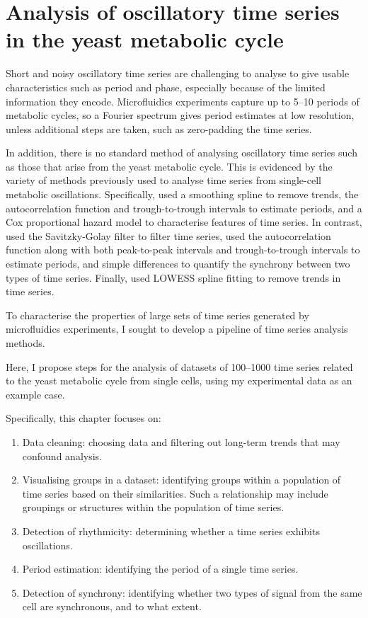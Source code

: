 \chapter{Analysis of oscillatory time series in the yeast metabolic cycle}
\label{ch:analysis}

Short and noisy oscillatory time series are challenging to analyse to give usable characteristics such as period and phase, especially because of the limited information they encode.
Microfluidics experiments capture up to 5--10 periods of metabolic cycles, so a Fourier spectrum gives period estimates at low resolution, unless additional steps are taken, such as zero-padding the time series.

In addition, there is no standard method of analysing oscillatory time series such as those that arise from the yeast metabolic cycle.
This is evidenced by the variety of methods previously used to analyse time series from single-cell metabolic oscillations.
Specifically, \textcite{papagiannakisAutonomousMetabolicOscillations2017} used a smoothing spline to remove trends, the autocorrelation function and trough-to-trough intervals to estimate periods, and a Cox proportional hazard model \parencite{coxRegressionModelsLifeTables1972} to characterise features of time series.
In contrast, \textcite{baumgartnerFlavinbasedMetabolicCycles2018} used the Savitzky-Golay filter to filter time series, used the autocorrelation function along with both peak-to-peak intervals and trough-to-trough intervals to estimate periods, and simple differences to quantify the synchrony between two types of time series.
Finally, \textcite{ozsezenInferenceHighLevelInteraction2019} used LOWESS spline fitting to remove trends in time series.

To characterise the properties of large sets of time series generated by microfluidics experiments, I sought to develop a pipeline of time series analysis methods.

Here, I propose steps for the analysis of datasets of 100--1000 time series related to the yeast metabolic cycle from single cells, using my experimental data as an example case.

Specifically, this chapter focuses on:
\begin{enumerate}
  \item Data cleaning: choosing data and filtering out long-term trends that may confound analysis.
  \item Visualising groups in a dataset: identifying groups within a population of time series based on their similarities.
        Such a relationship may include groupings or structures within the population of time series.
  \item Detection of rhythmicity: determining whether a time series exhibits oscillations.
  \item Period estimation: identifying the period of a single time series.
  \item Detection of synchrony: identifying whether two types of signal from the same cell are synchronous, and to what extent.
\end{enumerate}

